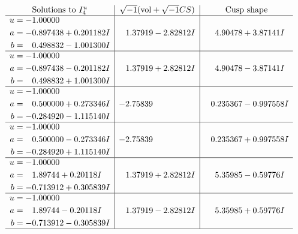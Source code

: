 \documentclass[1p]{elsarticle_modified}
\theoremstyle{definition}
\newcommand{\I}{\sqrt{-1}}
\begin{document}
$$\begin{array}{c|c|c}  
\text{Solutions to }I^u_{4}& \I (\text{vol} + \sqrt{-1}CS) & \text{Cusp shape}\\
 \hline 
\begin{aligned}
u &= -1.00000\phantom{ +0.000000I} \\
a &= -0.897438 + 0.201182 I \\
b &= \phantom{-}0.498832 - 1.001300 I\end{aligned}
 & \phantom{-}1.37919 - 2.82812 I & \phantom{-}4.90478 + 3.87141 I \\ \hline\begin{aligned}
u &= -1.00000\phantom{ +0.000000I} \\
a &= -0.897438 - 0.201182 I \\
b &= \phantom{-}0.498832 + 1.001300 I\end{aligned}
 & \phantom{-}1.37919 + 2.82812 I & \phantom{-}4.90478 - 3.87141 I \\ \hline\begin{aligned}
u &= -1.00000\phantom{ +0.000000I} \\
a &= \phantom{-}0.500000 + 0.273346 I \\
b &= -0.284920 - 1.115140 I\end{aligned}
 & -2.75839\phantom{ +0.000000I} & \phantom{-}0.235367 - 0.997558 I \\ \hline\begin{aligned}
u &= -1.00000\phantom{ +0.000000I} \\
a &= \phantom{-}0.500000 - 0.273346 I \\
b &= -0.284920 + 1.115140 I\end{aligned}
 & -2.75839\phantom{ +0.000000I} & \phantom{-}0.235367 + 0.997558 I \\ \hline\begin{aligned}
u &= -1.00000\phantom{ +0.000000I} \\
a &= \phantom{-}1.89744 + 0.20118 I \\
b &= -0.713912 + 0.305839 I\end{aligned}
 & \phantom{-}1.37919 + 2.82812 I & \phantom{-}5.35985 - 0.59776 I \\ \hline\begin{aligned}
u &= -1.00000\phantom{ +0.000000I} \\
a &= \phantom{-}1.89744 - 0.20118 I \\
b &= -0.713912 - 0.305839 I\end{aligned}
 & \phantom{-}1.37919 - 2.82812 I & \phantom{-}5.35985 + 0.59776 I\\
 \hline 
 \end{array}$$\newpage
\end{document}
